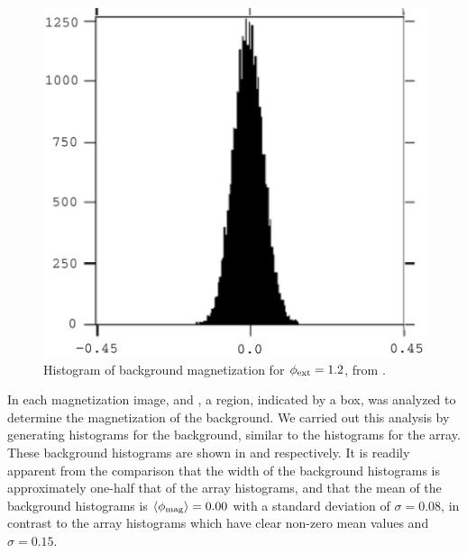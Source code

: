 \begin{figure}[p]
\includegraphics[width=5.7in]{figs/pme_exp/fig3_7_b_lg.ps}
\caption{Histogram of background magnetization for $\phi_{\mathrm{ext}} = 1.2$, from
.}
\label{fig:hist_background_b}
\end{figure}



%
%
In each magnetization image,  and 
, a region, 
indicated by a box, was analyzed to 
determine the magnetization of the background. We carried out this
analysis by generating histograms for the background, similar to the
histograms for the array. 
These background histograms are shown 
in  and  
respectively. 
It is readily apparent from the comparison that the width of the 
background histograms is approximately one-half that of the 
array histograms, and that the mean of the background histograms
is $\langle\phi_{\mathrm{mag}}\rangle=0.00$ with a standard deviation of
$\sigma = 0.08$, in contrast to the array histograms which
have clear non-zero mean values and $\sigma = 0.15$. 

